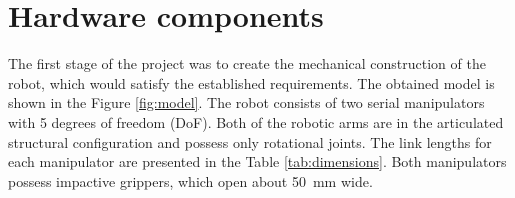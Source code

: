 \section{Hardware components}
\label{sec:hard}

The first stage of the project was to create the mechanical construction of the robot, which would satisfy the established requirements. The obtained model is shown in the Figure \ref{fig:model}. The robot consists of two serial manipulators with 5 degrees of freedom (DoF). Both of the robotic arms are in the articulated structural configuration and possess only rotational joints. The link lengths for each manipulator are presented in the Table \ref{tab:dimensions}. Both manipulators possess impactive grippers, which open about \SI{50}{\milli\meter} wide.

